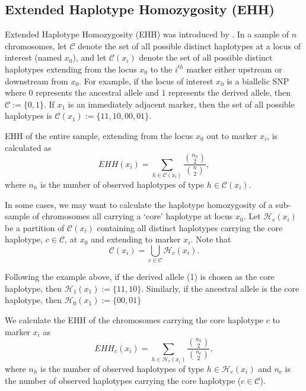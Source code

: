 \documentclass[12pt]{article}%
\begin{document}
\subsection{Extended Haplotype Homozygosity (EHH)}\label{sec:ehh}

Extended Haplotype Homozygosity (EHH) was introduced by \cite{SabetiEtAl02}. In a sample of $n$ chromosomes, let $\mathcal{C}$ denote the set of all possible
distinct haplotypes at a locus of interest (named $x_0$), and let 
$\mathcal{C}(x_i)$ denote the set of all possible distinct haplotypes 
extending from the locus $x_0$ to the $i^{th}$ marker either upstream or 
downstream from $x_0$.  For example, if the locus of interest $x_0$ is a 
biallelic SNP where $0$ represents the ancestral allele and $1$ represents the 
derived allele, then $\mathcal{C} := \{0,1\}$.  If $x_1$ is an immediately 
adjacent marker, then the set of all possible haplotypes is 
$\mathcal{C}(x_1) := \{11,10,00,01\}$.

EHH of the entire sample, extending from the locus $x_0$ 
out to marker $x_i$, is calculated as 
\begin{equation}\label{eq:ehh}
EHH(x_i) = \sum_{h \in \mathcal{C}(x_i)} \frac{{n_h \choose 2}}{{n \choose 2}},
\end{equation}
where $n_h$ is the number of observed haplotypes of type $h \in \mathcal{C}(x_i)$.

In some cases, we may want to calculate the haplotype homozygosity of a 
sub-sample of chromosomes all carrying a `core' haplotype at locus $x_0$. Let 
$\mathcal{H}_c(x_i)$ be a partition of $\mathcal{C}(x_i)$ containing all 
distinct haplotypes carrying the core haplotype, $c \in \mathcal{C}$, at $x_0$ and 
extending to marker $x_i$.  Note that
\begin{equation} 
\mathcal{C}(x_i) = \bigcup_{c \in \mathcal{C}}\mathcal{H}_c(x_i).
\end{equation}

Following the example above, if the derived allele (1) is chosen as the core haplotype,
then $\mathcal{H}_1(x_1) := \{11,10\}$.  Similarly, if the ancestral allele is the core
haplotype, then $\mathcal{H}_0(x_1) := \{00,01\}$

We calculate the EHH of the chromosomes carrying the core haplotype $c$ to marker $x_i$ as
\begin{equation}\label{eq:ehh-core}
EHH_c(x_i) = \sum_{h \in \mathcal{H}_c(x_i)} \frac{{n_h \choose 2}}{{n_c \choose 2}},
\end{equation}
where $n_h$ is the number of observed haplotypes of type $h \in \mathcal{H}_c(x_i)$ and 
$n_c$ is the number of observed haplotypes carrying the core haplotype ($c \in \mathcal{C}$). 
\end{document}
